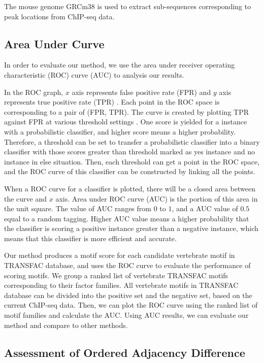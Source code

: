 \documentclass[journal,transmag]{IEEEtran}
\begin{document}
The mouse genome GRCm38 \cite{mybibfile:musgen} is used to extract
sub-sequences corresponding to peak locations from ChIP-seq data.



\subsection{Area Under Curve}


In order to evaluate our method, we use the area under receiver
operating characteristic (ROC) curve (AUC)
\cite{mybibfile:meanofroc} to analysis our results.

In the ROC graph, $x$ axis represents false positive rate (FPR) and
$y$ axis represents true positive rate (TPR)
\cite{mybibfile:statistics}. Each point in the ROC space is
corresponding to a pair of (FPR, TPR). The curve is created by
plotting TPR against FPR at various threshold settings
\cite{mybibfile:introroc}. One score is yielded for a instance with
a probabilistic classifier, and higher score means a higher
probability. Therefore, a threshold can be set to transfer a
probabilistic classifier into a binary classifier with those scores
greater than threshold marked as yes instance and no instance in
else situation. Then, each threshold can get a point in the ROC
space, and the ROC curve of this classifier can be constructed by
linking all the points.

When a ROC curve for a classifier is plotted, there will be a closed
area between the curve and $x$ axis. Area under ROC curve (AUC) is
the portion of this area in the unit square. The value of AUC ranges
from $0$ to $1$, and a AUC value of $0.5$ equal to a random tagging.
Higher AUC value means a higher probability that the classifier is
scoring a positive instance greater than a negative instance, which
means that this classifier is more efficient and accurate.

Our method produces a motif score for each candidate vertebrate
motif in TRANSFAC database, and uses the ROC curve to evaluate the
performance of scoring motifs. We group a ranked list of vertebrate
TRANSFAC motifs corresponding to their factor families. All
vertebrate motifs in TRANSFAC database can be divided into the
positive set and the negative set, based on the current ChIP-seq
data. Then, we can plot the ROC curve using the ranked list of motif
families and calculate the AUC. Using AUC results, we can evaluate
our method and compare to other methods.


\subsection{Assessment of Ordered Adjacency Difference}
\end{document}
